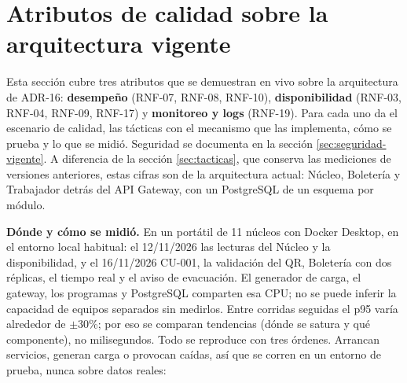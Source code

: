 
\section{Atributos de calidad sobre la arquitectura vigente}
\label{sec:atributos-vigentes}

Esta sección cubre tres atributos que se demuestran en vivo sobre la arquitectura de ADR-16:
\textbf{desempeño} (RNF-07, RNF-08, RNF-10), \textbf{disponibilidad} (RNF-03, RNF-04, RNF-09,
RNF-17) y \textbf{monitoreo y logs} (RNF-19). Para cada uno da el
escenario de calidad, las tácticas con el mecanismo que las implementa, cómo se prueba y lo que
se midió. Seguridad se documenta en la sección \ref{sec:seguridad-vigente}. A diferencia de la sección \ref{sec:tacticas}, que conserva las mediciones de versiones
anteriores, estas cifras son de la arquitectura actual: Núcleo, Boletería y Trabajador detrás del
API Gateway, con un PostgreSQL de un esquema por módulo.

\medskip
\noindent\textbf{Dónde y cómo se midió.} En un portátil de 11 núcleos con Docker Desktop, en el
entorno local habitual: el 12/11/2026 las lecturas del Núcleo y la disponibilidad, y el 16/11/2026
CU-001, la validación del QR, Boletería con dos réplicas, el tiempo real y el aviso de evacuación. El generador de carga, el gateway, los programas y
PostgreSQL comparten esa CPU; no se puede inferir la capacidad de equipos separados
sin medirlos. Entre corridas seguidas el p95 varía alrededor de $\pm$30\%; por
eso se comparan tendencias (dónde se satura y qué componente), no milisegundos.
Todo se reproduce con tres órdenes. Arrancan servicios, generan carga o provocan
caídas, así que se corren en un entorno de prueba, nunca sobre datos reales:

